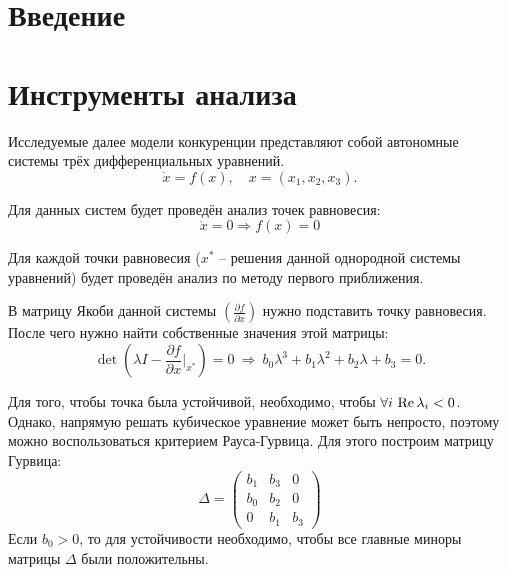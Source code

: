 \section{Введение}



\section{Инструменты анализа}
    Исследуемые далее модели конкуренции представляют собой автономные системы трёх дифференциальных уравнений.
    \[
        \dot{x} = f(x), \quad x = (x_1, x_2, x_3).
    \]

    Для данных систем будет проведён анализ точек равновесия:
    \[
        \dot{x} = 0 \Rightarrow f(x) = 0
    \]

    Для каждой точки равновесия (\( x^* \) -- решения данной однородной системы уравнений) будет проведён анализ по методу первого приближения.

    В матрицу Якоби данной системы \( \left( \frac{\partial f}{\partial x} \right) \) нужно подставить точку равновесия. После чего нужно найти собственные значения этой матрицы:
    \[
        \det \left( \lambda I - \frac{\partial f}{\partial x}\big|_{x^*} \right) = 0 ~ \Rightarrow ~ b_0 \lambda^3 + b_1 \lambda^2 + b_2 \lambda + b_3 = 0.
    \]

    Для того, чтобы точка была устойчивой, необходимо, чтобы \( \forall i \, \operatorname{Re} \lambda_i < 0 \). Однако, напрямую решать кубическое уравнение может быть непросто, поэтому можно воспользоваться критерием Рауса-Гурвица. Для этого построим матрицу Гурвица: 
    \[
        \Delta = \left( \begin{matrix}
            b_1 & b_3 & 0 \\
            b_0 & b_2 & 0 \\
            0   & b_1 & b_3
        \end{matrix} \right)
    \]
    Если \( b_0 > 0\), то для устойчивости необходимо, чтобы все главные миноры матрицы \( \Delta \) были положительны.